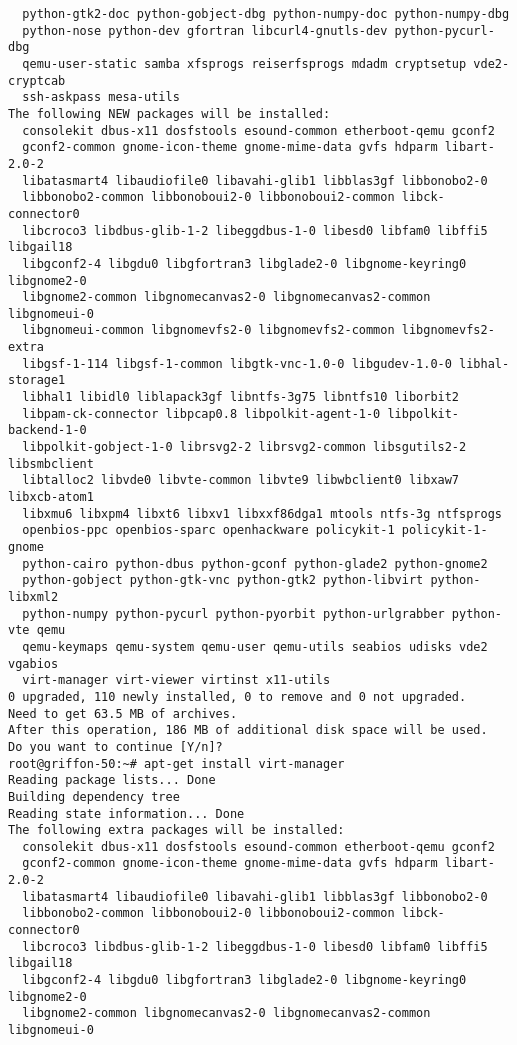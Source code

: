 \documentclass{article}
\begin{document}
\begin{lstlisting}
  python-gtk2-doc python-gobject-dbg python-numpy-doc python-numpy-dbg
  python-nose python-dev gfortran libcurl4-gnutls-dev python-pycurl-dbg
  qemu-user-static samba xfsprogs reiserfsprogs mdadm cryptsetup vde2-cryptcab
  ssh-askpass mesa-utils
The following NEW packages will be installed:
  consolekit dbus-x11 dosfstools esound-common etherboot-qemu gconf2
  gconf2-common gnome-icon-theme gnome-mime-data gvfs hdparm libart-2.0-2
  libatasmart4 libaudiofile0 libavahi-glib1 libblas3gf libbonobo2-0
  libbonobo2-common libbonoboui2-0 libbonoboui2-common libck-connector0
  libcroco3 libdbus-glib-1-2 libeggdbus-1-0 libesd0 libfam0 libffi5 libgail18
  libgconf2-4 libgdu0 libgfortran3 libglade2-0 libgnome-keyring0 libgnome2-0
  libgnome2-common libgnomecanvas2-0 libgnomecanvas2-common libgnomeui-0
  libgnomeui-common libgnomevfs2-0 libgnomevfs2-common libgnomevfs2-extra
  libgsf-1-114 libgsf-1-common libgtk-vnc-1.0-0 libgudev-1.0-0 libhal-storage1
  libhal1 libidl0 liblapack3gf libntfs-3g75 libntfs10 liborbit2
  libpam-ck-connector libpcap0.8 libpolkit-agent-1-0 libpolkit-backend-1-0
  libpolkit-gobject-1-0 librsvg2-2 librsvg2-common libsgutils2-2 libsmbclient
  libtalloc2 libvde0 libvte-common libvte9 libwbclient0 libxaw7 libxcb-atom1
  libxmu6 libxpm4 libxt6 libxv1 libxxf86dga1 mtools ntfs-3g ntfsprogs
  openbios-ppc openbios-sparc openhackware policykit-1 policykit-1-gnome
  python-cairo python-dbus python-gconf python-glade2 python-gnome2
  python-gobject python-gtk-vnc python-gtk2 python-libvirt python-libxml2
  python-numpy python-pycurl python-pyorbit python-urlgrabber python-vte qemu
  qemu-keymaps qemu-system qemu-user qemu-utils seabios udisks vde2 vgabios
  virt-manager virt-viewer virtinst x11-utils
0 upgraded, 110 newly installed, 0 to remove and 0 not upgraded.
Need to get 63.5 MB of archives.
After this operation, 186 MB of additional disk space will be used.
Do you want to continue [Y/n]? 
root@griffon-50:~# apt-get install virt-manager
Reading package lists... Done
Building dependency tree       
Reading state information... Done
The following extra packages will be installed:
  consolekit dbus-x11 dosfstools esound-common etherboot-qemu gconf2
  gconf2-common gnome-icon-theme gnome-mime-data gvfs hdparm libart-2.0-2
  libatasmart4 libaudiofile0 libavahi-glib1 libblas3gf libbonobo2-0
  libbonobo2-common libbonoboui2-0 libbonoboui2-common libck-connector0
  libcroco3 libdbus-glib-1-2 libeggdbus-1-0 libesd0 libfam0 libffi5 libgail18
  libgconf2-4 libgdu0 libgfortran3 libglade2-0 libgnome-keyring0 libgnome2-0
  libgnome2-common libgnomecanvas2-0 libgnomecanvas2-common libgnomeui-0

\end{lstlisting}
\end{document}
